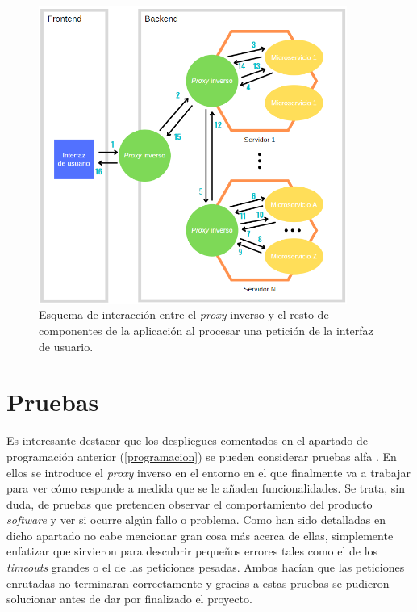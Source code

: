 \documentclass[11pt,spanish,listoffigures]{tfgetsinf}
\begin{document}
\begin{figure}[ht]
\centering
\includegraphics[width=0.9\textwidth]{imagenes/esquemaInteraccionProxyInverso}
\caption{Esquema de interacción entre el \emph{proxy} inverso y el resto de componentes de la aplicación al procesar una petición de la interfaz de usuario.}
	\label{esquemaInteraccionProxyInverso}
\end{figure}

\newpage %


	\section{Pruebas} \label{pruebas}

Es interesante destacar que los despliegues comentados en el apartado de programación anterior (\ref{programacion}) se pueden considerar pruebas alfa \cite{AlphaTest}. En ellos se introduce el \emph{proxy} inverso en el entorno en el que finalmente va a trabajar para ver cómo responde a medida que se le añaden funcionalidades. Se trata, sin duda, de pruebas que pretenden observar el comportamiento del producto \emph{software} y ver si ocurre algún fallo o problema. Como han sido detalladas en dicho apartado no cabe mencionar gran cosa más acerca de ellas, simplemente enfatizar que sirvieron para descubrir pequeños errores tales como el de los \emph{timeouts} grandes o el de las peticiones pesadas. Ambos hacían que las peticiones enrutadas no terminaran correctamente y gracias a estas pruebas se pudieron solucionar antes de dar por finalizado el proyecto.
\end{document}
